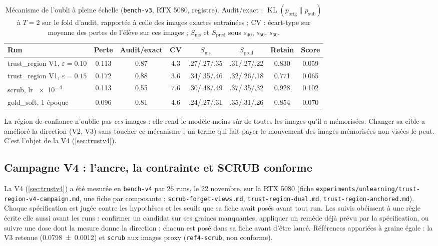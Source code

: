 \documentclass[11pt,a4paper]{article}
\newcommand{\KL}{\operatorname{KL}}
\newcommand{\orig}{\mathrm{orig}}
\newcommand{\sub}{\mathrm{sub}}
\newcommand{\code}[1]{\texttt{#1}}
\newcommand{\chemin}[1]{\nolinkurl{#1}}%
\begin{document}
\begin{table}[ht]
  \centering\small
  \caption{Mécanisme de l'oubli à pleine échelle (\code{bench-v3}, RTX 5080, registre). Audit/exact :
  $\KL(p_\orig\|p_\sub)$ à $T=2$ sur le fold d'audit, rapportée à celle des images exactes
  entraînées ; CV : écart-type sur moyenne des pertes de l'élève sur ces images ; $S_{\text{ms}}$ et
  $S_{\text{pred}}$ sous $s_{40}$, $s_{50}$, $s_{60}$.}\label{tab:diagnostic}
  \setlength{\tabcolsep}{3.4pt}
  \begin{tabular}{@{}l S[table-format=1.3] S[table-format=1.2] S[table-format=1.1] c c S S[table-format=1.3]@{}}
    \toprule
    Run & {Perte} & {Audit/exact} & {CV} & {$S_{\text{ms}}$} & {$S_{\text{pred}}$} & {Retain} & {Score}\\
    \midrule
    trust\_region V1, $\varepsilon=\num{0.10}$ & 0.113 & 0.87 & 4.3 & .27/.27/.35 & .31/.27/.22 & 0.830 & 0.059\\
    trust\_region V1, $\varepsilon=\num{0.15}$ & 0.172 & 0.88 & 3.6 & .34/.35/.46 & .32/.26/.18 & 0.771 & 0.065\\
    scrub, lr \num{e-4} & 0.113 & 0.55 & 7.6 & .30/.48/.49 & .37/.35/.32 & 0.928 & 0.102\\
    gold\_soft, 1 époque & 0.096 & 0.81 & 4.6 & .24/.27/.31 & .35/.31/.26 & 0.854 & 0.070\\
    \bottomrule
  \end{tabular}
\end{table}

\begin{retenir}
La région de confiance n'oublie pas \emph{ces} images : elle rend le modèle moins sûr de toutes les
images qu'il a mémorisées. Changer sa cible a amélioré la direction (V2, V3) sans toucher ce
mécanisme ; un terme qui fait payer le mouvement des images mémorisées non visées le peut. C'est
l'objet de la V4 (\cref{sec:trustv4}).
\end{retenir}

\subsection{Campagne V4 : l'ancre, la contrainte et SCRUB conforme}\label{sec:campagnev4}
La V4 (\cref{sec:trustv4}) a été mesurée en \code{bench-v4} par 26 runs, le 22 novembre, sur la RTX
5080 (fiche \chemin{experiments/unlearning/trust-region-v4-campaign.md}, une fiche par
composante : \chemin{scrub-forget-views.md}, \chemin{trust-region-dual.md},
\chemin{trust-region-anchored.md}). Chaque spécification est jugée contre les hypothèses et les
seuils que sa fiche avait posés avant tout run. Les suivis obéissent à une règle écrite elle aussi
avant les runs : confirmer un candidat sur ses graines manquantes, appliquer un remède déjà prévu
par la spécification, ou suivre une dose dont la mesure donne la direction ; chacun est posé dans
sa fiche avant d'être lancé. Références appariées à graine égale : la V3 retenue
(\num{0.0798 +- 0.0012}) et \code{scrub} aux images proxy (\code{ref4-scrub}, non conforme).
\end{document}
